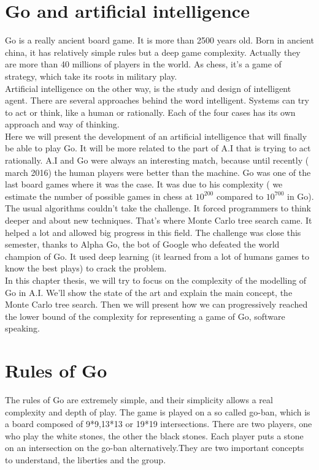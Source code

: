 \section{Go and artificial intelligence}

Go is a really ancient board game. It is more than 2500 years old. Born in ancient china, it has relatively simple rules but a deep game complexity.  Actually they are more than 40 millions of players in the world. As chess, it's a game of strategy, which take its roots in military play. 
\\

Artificial intelligence on the other way, is the study and design of intelligent agent. There are several approaches behind the word intelligent. Systems can try to act or think,  like a human or rationally. Each of the four cases has its own approach and way of thinking. 
\\

Here we will present the development of an artificial intelligence that will finally be able to play Go. It will be more related to the part of A.I that is trying to act rationally. A.I and Go were always an interesting match, because until recently ( march 2016) the human players were better than the machine. Go was one of the last board games where it was the case. It was due to his complexity ( we estimate the number of possible games in chess at $10^200$  compared to $10^700$ in Go).  The usual algorithms couldn't take the challenge. It forced programmers to think deeper and about new techniques. That's where Monte Carlo tree search came. It helped a lot and allowed big progress in this field. The challenge was close this semester, thanks to Alpha Go, the bot of Google who defeated the world champion of Go. It used deep learning (it learned from a lot of humans games to know the best plays) to crack the problem. 
\\

In this chapter thesis, we will try to focus on the complexity of the modelling of Go in A.I. We'll show the state of the art and explain the main concept, the Monte Carlo tree search. Then we will present how we can progressively reached the lower bound of the complexity for representing a game of Go, software speaking. 

\section{Rules of Go}

The rules of Go are extremely simple, and their simplicity allows a real complexity and depth of play. The game is played on a so called go-ban, which is a board composed of 9*9,13*13 or 19*19 intersections. There are two players, one who play the white stones, the other the black stones. Each player puts a stone on an intersection on the go-ban alternatively.They are two important concepts to understand, the liberties and the group. 
\\

